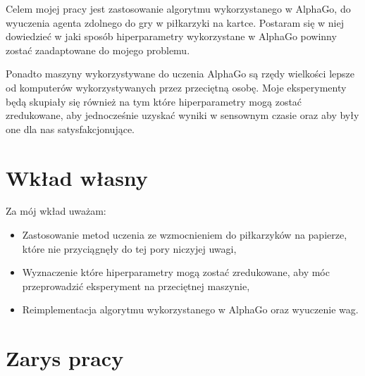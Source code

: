 \documentclass[licencjacka]{pracamgr}
\begin{document}

Celem mojej pracy jest zastosowanie algorytmu wykorzystanego w AlphaGo, do wyuczenia agenta zdolnego do gry w piłkarzyki na kartce. Postaram się w niej dowiedzieć w jaki sposób hiperparametry wykorzystane w AlphaGo powinny zostać zaadaptowane do mojego problemu. 

Ponadto maszyny wykorzystywane do uczenia AlphaGo są rzędy wielkości lepsze od komputerów wykorzystywanych przez przeciętną osobę. Moje eksperymenty będą skupiały się również na tym które hiperparametry mogą zostać zredukowane, aby jednocześnie uzyskać wyniki w sensownym czasie oraz aby były one dla nas satysfakcjonujące.


\section{Wkład własny}

Za mój wkład uważam:

\begin{itemize}

\item Zastosowanie metod uczenia ze wzmocnieniem do piłkarzyków na papierze, które nie przyciągnęły do tej pory niczyjej uwagi,

\item Wyznaczenie które hiperparametry mogą zostać zredukowane, aby móc przeprowadzić eksperyment na przeciętnej maszynie,

\item Reimplementacja algorytmu wykorzystanego w AlphaGo oraz wyuczenie wag.

\end{itemize}

\section{Zarys pracy}
\end{document}
